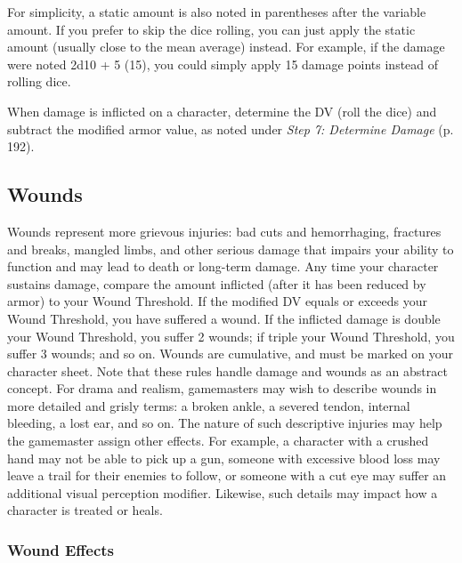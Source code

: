 For simplicity, a static amount is also noted in 
parentheses after the variable amount. If you prefer 
to skip the dice rolling, you can just apply the static 
amount (usually close to the mean average) instead. 
For example, if the damage were noted 2d10 + 5 (15), 
you could simply apply 15 damage points instead of 
rolling dice.

When damage is inflicted on a character, determine the 
DV (roll the dice) and subtract the modified armor value, 
as noted under \textit{Step 7: Determine Damage} (p. 192).

\subsection{Wounds}

Wounds represent more grievous injuries: bad cuts and 
hemorrhaging, fractures and breaks, mangled limbs, 
and other serious damage that impairs your ability to 
function and may lead to death or long-term damage.
Any time your character sustains damage, compare 
the amount inflicted (after it has been reduced by 
armor) to your Wound Threshold. If the modified DV 
equals or exceeds your Wound Threshold, you have 
suffered a wound. If the inflicted damage is double 
your Wound Threshold, you suffer 2 wounds; if 
triple your Wound Threshold, you suffer 3 wounds; 
and so on.
Wounds are cumulative, and must be marked on 
your character sheet.
Note that these rules handle damage and wounds 
as an abstract concept. For drama and realism, 
gamemasters may wish to describe wounds in more 
detailed and grisly terms: a broken ankle, a severed 
tendon, internal bleeding, a lost ear, and so on. The 
nature of such descriptive injuries may help the gamemaster
assign other effects. For example, a character
with a crushed hand may not be able to pick up a gun, 
someone with excessive blood loss may leave a trail 
for their enemies to follow, or someone with a cut eye 
may suffer an additional visual perception modifier. 
Likewise, such details may impact how a character is 
treated or heals.

\subsubsection{Wound Effects}

